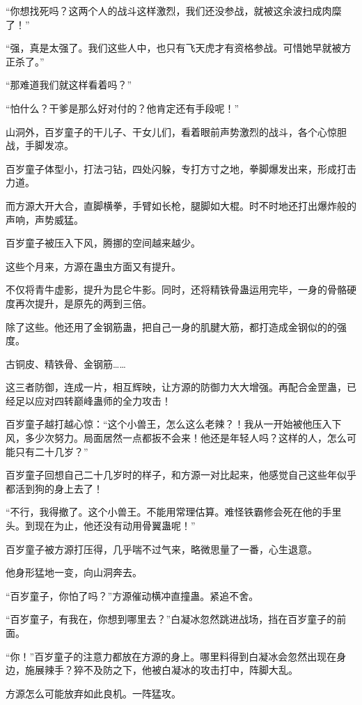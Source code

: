 \begin{this_body}
“你想找死吗？这两个人的战斗这样激烈，我们还没参战，就被这余波扫成肉糜了！”

“强，真是太强了。我们这些人中，也只有飞天虎才有资格参战。可惜她早就被方正杀了。”

“那难道我们就这样看着吗？”

“怕什么？干爹是那么好对付的？他肯定还有手段呢！”

山洞外，百岁童子的干儿子、干女儿们，看着眼前声势激烈的战斗，各个心惊胆战，手脚发凉。

百岁童子体型小，打法刁钻，四处闪躲，专打方寸之地，拳脚爆发出来，形成打击力道。

而方源大开大合，直脚横拳，手臂如长枪，腿脚如大棍。时不时地还打出爆炸般的声响，声势威猛。

百岁童子被压入下风，腾挪的空间越来越少。

这些个月来，方源在蛊虫方面又有提升。

不仅将青牛虚影，提升为昆仑牛影。同时，还将精铁骨蛊运用完毕，一身的骨骼硬度再次提升，是原先的两到三倍。

除了这些。他还用了金钢筋蛊，把自己一身的肌腱大筋，都打造成金钢似的的强度。

古铜皮、精铁骨、金钢筋……

这三者防御，连成一片，相互辉映，让方源的防御力大大增强。再配合金罡蛊，已经足以应对四转巅峰蛊师的全力攻击！

百岁童子越打越心惊：“这个小兽王，怎么这么老辣？！我从一开始被他压入下风，多少次努力。局面居然一点都扳不会来！他还是年轻人吗？这样的人，怎么可能只有二十几岁？”

百岁童子回想自己二十几岁时的样子，和方源一对比起来，他感觉自己这些年似乎都活到狗的身上去了！

“不行，我得撤了。这个小兽王。不能用常理估算。难怪铁霸修会死在他的手里头。到现在为止，他还没有动用骨翼蛊呢！”

百岁童子被方源打压得，几乎喘不过气来，略微思量了一番，心生退意。

他身形猛地一变，向山洞奔去。

“百岁童子，你怕了吗？”方源催动横冲直撞蛊。紧追不舍。

“百岁童子，有我在，你想到哪里去？”白凝冰忽然跳进战场，挡在百岁童子的前面。

“你！”百岁童子的注意力都放在方源的身上。哪里料得到白凝冰会忽然出现在身边，施展辣手？猝不及防之下，他被白凝冰的攻击打中，阵脚大乱。

方源怎么可能放弃如此良机。一阵猛攻。


\end{this_body}
